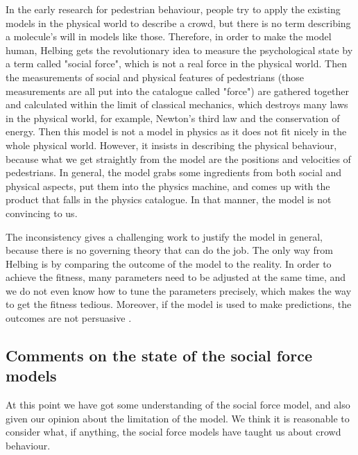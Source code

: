 In the early research for pedestrian behaviour, people try to apply the existing 
models in the physical world to describe a crowd, but there is no term describing 
a molecule's will in models like those. Therefore, in order to make the model 
human, Helbing gets the revolutionary idea to measure the psychological state 
by a term called "social force", which is not a real force in the physical world. 
\cite{social-force} Then the measurements of social and physical features 
of pedestrians (those measurements are all put into the catalogue called "force") 
are gathered together and calculated within the limit of classical mechanics, 
which destroys many laws in the physical world, for example, Newton's third law 
and the conservation of energy. Then this model is not a model in physics as 
it does not fit nicely in the whole physical world. However, it insists in describing 
the physical behaviour, because what we get straightly from the model are 
the positions and velocities of pedestrians. In general, the model grabs some 
ingredients from both social and physical aspects, put them into the physics 
machine, and comes up with the product that falls in the physics catalogue. 
In that manner, the model is not convincing to us.

The inconsistency gives a challenging work to justify the model in general, 
because there is no governing theory that can do the job. The only way from Helbing 
is by comparing the outcome of the model to the reality. In order to achieve the 
fitness, many parameters need to be adjusted at the same time, and we do not 
even know how to tune the parameters precisely, which makes the way to 
get the fitness tedious. Moreover, if the model is used to make predictions, the
outcomes are not persuasive . 

\subsection{Comments on the state of the social force models}
At this point we have got some understanding of the social force model, and 
also given our opinion about the limitation of the model. We think it is 
reasonable to consider what, if anything, the social force models have taught 
us about crowd behaviour. 

